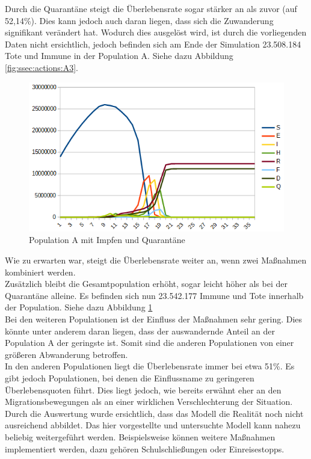   Durch die Quarantäne steigt die Überlebensrate sogar stärker an als zuvor (auf 52,14\%). Dies kann jedoch auch daran liegen, dass sich die Zuwanderung signifikant verändert hat. Wodurch dies ausgelöst wird, ist durch die vorliegenden Daten nicht ersichtlich, jedoch befinden sich am Ende der Simulation 23.508.184 Tote und Immune in der Population A. Siehe dazu Abbildung \ref{fig:ssec:actions:A3}.\\
 \begin{figure}
 \includegraphics[width=1\textwidth]{massnahmen/A4}
\caption{Population A mit Impfen und Quarantäne}
\label{fig:ssec:actions:A4}
\end{figure}
  Wie zu erwarten war, steigt die Überlebensrate weiter an, wenn zwei Maßnahmen kombiniert werden.\\
  Zusätzlich bleibt die Gesamtpopulation erhöht, sogar leicht höher als bei der Quarantäne alleine. Es befinden sich nun 23.542.177 Immune und Tote innerhalb der Population. Siehe dazu Abbildung \ref{fig:ssec:actions:A4}\\
   Bei den weiteren Populationen ist der Einfluss der Maßnahmen sehr gering. Dies könnte unter anderem daran liegen, dass der auswandernde Anteil an der Population A der geringste ist. Somit sind die anderen Populationen von einer größeren Abwanderung betroffen.\\
   In den anderen Populationen liegt die Überlebensrate immer bei etwa 51\%. Es gibt jedoch Populationen, bei denen die Einflussname zu geringeren Überlebensquoten führt. Dies liegt jedoch, wie bereits erwähnt eher an den Migrationsbewegungen als an einer wirklichen Verschlechterung der Situation.\\
   Durch die Auswertung wurde ersichtlich, dass das Modell die Realität noch nicht ausreichend abbildet. Das hier vorgestellte und untersuchte Modell kann nahezu beliebig weitergeführt werden. Beispielsweise können weitere Maßnahmen implementiert werden, dazu gehören Schulschließungen oder Einreisestopps.\\
